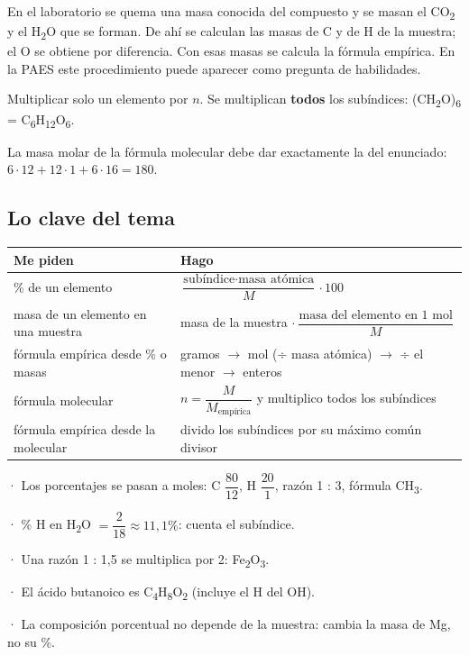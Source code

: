 \begin{clave} En el laboratorio se quema una masa conocida del compuesto y se masan el CO\textsubscript{2} y el H\textsubscript{2}O que se forman. De ahí se calculan las masas de C y de H de la muestra; el O se obtiene por diferencia. Con esas masas se calcula la fórmula empírica. En la PAES este procedimiento puede aparecer como pregunta de habilidades.\end{clave}
 
\begin{ojo} Multiplicar solo un elemento por $n$. Se multiplican \textbf{todos} los subíndices: (CH\textsubscript{2}O)\textsubscript{6} = C\textsubscript{6}H\textsubscript{12}O\textsubscript{6}.\end{ojo}
 
\begin{clave}[{Control}] La masa molar de la fórmula molecular debe dar exactamente la del enunciado: $6\cdot 12 + 12\cdot 1 + 6\cdot 16 = 180$. \end{clave}
\subsection{Lo clave del tema}
\begin{center}\small
\begin{tabularx}{\linewidth}{@{}>{\raggedright\arraybackslash\hsize=0.93\hsize}X>{\raggedright\arraybackslash\hsize=1.07\hsize}X@{}}
\toprule
\textbf{Me piden} & \textbf{Hago} \\
\midrule
\% de un elemento & $\dfrac{\text{subíndice}\cdot\text{masa atómica}}{M}\cdot 100$ \\
masa de un elemento en una muestra & masa de la muestra $\cdot\ \dfrac{\text{masa del elemento en 1 mol}}{M}$ \\
fórmula empírica desde \% o masas & gramos \ensuremath{\rightarrow} mol (÷ masa atómica) \ensuremath{\rightarrow} ÷ el menor \ensuremath{\rightarrow} enteros \\
fórmula molecular & $n = \dfrac{M}{M_{\text{empírica}}}$ y multiplico todos los subíndices \\
fórmula empírica desde la molecular & divido los subíndices por su máximo común divisor \\
\bottomrule
\end{tabularx}
\end{center}
 
\begin{clave}[{Recuerda}] · Los porcentajes se pasan a moles: C $\dfrac{80}{12}$, H $\dfrac{20}{1}$, razón 1 : 3, fórmula CH\textsubscript{3}.\par · \% H en H\textsubscript{2}O $= \dfrac{2}{18}\approx 11{,}1\%$: cuenta el subíndice.\par · Una razón 1 : 1,5 se multiplica por 2: Fe\textsubscript{2}O\textsubscript{3}.\par · El ácido butanoico es C\textsubscript{4}H\textsubscript{8}O\textsubscript{2} (incluye el H del OH).\par · La composición porcentual no depende de la muestra: cambia la masa de Mg, no su \%.\end{clave}
 
